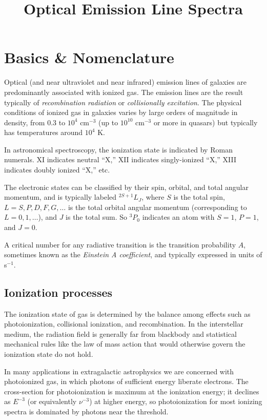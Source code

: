 \title{\bf Optical Emission Line Spectra}

\section{Basics \& Nomenclature}

Optical (and near ultraviolet and near infrared) emission lines of
galaxies are predominantly associated with ionized gas. The emission
lines are the result typically of {\it recombination radiation} or
{\it collisionally excitation}. The physical conditions of ionized gas
in galaxies varies by large orders of magnitude in density, from 0.3
to $10^4$ cm$^{-3}$ (up to $10^{10}$ cm$^{-3}$ or more in quasars) but
typically has temperatures around $10^4$ K.

In astronomical spectroscopy, the ionization state is indicated by
Roman numerals. XI indicates neutral ``X,'' XII indicates
singly-ionized ``X,'' XIII indicates doubly ionized ``X,'' etc.

The electronic states can be classified by their spin, orbital, and
total angular momentum, and is typically labeled ${}^{2S+1}L_J$, where $S$
is the total spin, $L=S, P, D, F, G, \ldots$ is the total orbital
angular momentum (corresponding to $L=0,1,\ldots$), and $J$ is the
total sum. So ${}^3P_0$ indicates an atom with $S=1$, $P=1$, and
$J=0$.

A critical number for any radiative transition is the transition
probability $A$, sometimes known as the {\it Einstein A coefficient},
and typically expressed in units of s$^{-1}$.

\subsection{Ionization processes}

The ionization state of gas is determined by the balance among effects
such as photoionization, collisional ionization, and recombination. In
the interstellar medium, the radiation field is generally far from
blackbody and statistical mechanical rules like the law of mass action
that would otherwise govern the ionization state do not hold.

In many applications in extragalactic astrophysics we are concerned
with photoionized gas, in which photons of sufficient energy liberate
electrons. The cross-section for photoionization is maximum at the
ionization energy; it declines as $E^{-3}$ (or equivalently
$\nu^{-3}$) at higher energy, so photoionization for most ionizing
spectra is dominated by photons near the threshold.

